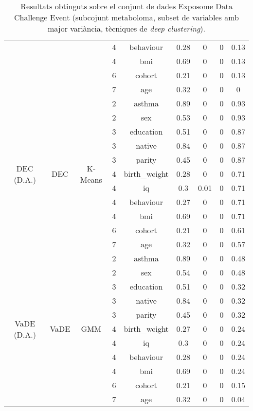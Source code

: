 \documentclass[CAT,BIB]{TFUOC}%
\begin{document}
\begin{table}
\begin{tabular}{@{}ccccccccc@{}}
            &  &  & 4 & behaviour & 0.28 & 0 & 0 & 0.13 \\
            &  &  & 4 & bmi & 0.69 & 0 & 0 & 0.13 \\
            &  &  & 6 & cohort & 0.21 & 0 & 0 & 0.13 \\
            &  &  & 7 & age & 0.32 & 0 & 0 & 0 \\ \midrule
            \multirow{11}{*}{DEC (D.A.)} & \multirow{11}{*}{DEC} & \multirow{11}{*}{K-Means} & 2 & asthma & 0.89 & 0 & 0 & 0.93 \\
            &  &  & 2 & sex & 0.53 & 0 & 0 & 0.93 \\
            &  &  & 3 & education & 0.51 & 0 & 0 & 0.87 \\
            &  &  & 3 & native & 0.84 & 0 & 0 & 0.87 \\
            &  &  & 3 & parity & 0.45 & 0 & 0 & 0.87 \\
            &  &  & 4 & birth\_weight & 0.28 & 0 & 0 & 0.71 \\
            &  &  & 4 & iq & 0.3 & 0.01 & 0 & 0.71 \\
            &  &  & 4 & behaviour & 0.27 & 0 & 0 & 0.71 \\
            &  &  & 4 & bmi & 0.69 & 0 & 0 & 0.71 \\
            &  &  & 6 & cohort & 0.21 & 0 & 0 & 0.61 \\
            &  &  & 7 & age & 0.32 & 0 & 0 & 0.57 \\ \midrule
            \multirow{11}{*}{VaDE (D.A.)} & \multirow{11}{*}{VaDE} & \multirow{11}{*}{GMM} & 2 & asthma & 0.89 & 0 & 0 & 0.48 \\
            &  &  & 2 & sex & 0.54 & 0 & 0 & 0.48 \\
            &  &  & 3 & education & 0.51 & 0 & 0 & 0.32 \\
            &  &  & 3 & native & 0.84 & 0 & 0 & 0.32 \\
            &  &  & 3 & parity & 0.45 & 0 & 0 & 0.32 \\
            &  &  & 4 & birth\_weight & 0.27 & 0 & 0 & 0.24 \\
            &  &  & 4 & iq & 0.3 & 0 & 0 & 0.24 \\
            &  &  & 4 & behaviour & 0.28 & 0 & 0 & 0.24 \\
            &  &  & 4 & bmi & 0.69 & 0 & 0 & 0.24 \\
            &  &  & 6 & cohort & 0.21 & 0 & 0 & 0.15 \\
            &  &  & 7 & age & 0.32 & 0 & 0 & 0.04 \\ \bottomrule
        \end{tabular}
        \caption[Exposome Data Challenge Event: resultats - part 4]{
            Resultats obtinguts sobre el conjunt de dades Exposome Data Challenge Event
            (subcojunt metaboloma, subset de variables amb major variància, tècniques de \textit{deep clustering}).
        }
        \label{t:results_exposome4}
    \end{table}
\end{document}
